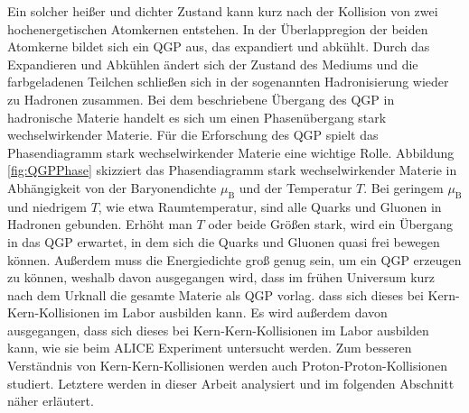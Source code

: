 \newline
Ein solcher hei{\ss}er und dichter Zustand kann kurz nach der Kollision von zwei hochenergetischen Atomkernen entstehen.
In der \"Uberlappregion der beiden Atomkerne bildet sich ein QGP aus, das expandiert und abk\"uhlt.
Durch das Expandieren und Abk\"uhlen \"andert sich der Zustand des Mediums und die farbgeladenen Teilchen schlie{\ss}en sich in der sogenannten Hadronisierung wieder zu Hadronen zusammen.
Bei dem beschriebene \"Ubergang des QGP in hadronische Materie handelt es sich um einen Phasen\"ubergang stark wechselwirkender Materie.
\newline
F\"ur die Erforschung des QGP spielt das Phasendiagramm stark wechselwirkender Materie eine wichtige Rolle.
Abbildung \ref{fig:QGPPhase} skizziert das Phasendiagramm stark wechselwirkender Materie in Abh\"angigkeit von der Baryonendichte $\mu_{\text{B}}$ und der Temperatur $T$.
Bei geringem $\mu_{\text{B}}$ und niedrigem $T$, wie etwa Raumtemperatur, sind alle Quarks und Gluonen in Hadronen gebunden.
Erh\"oht man $T$ oder beide Gr\"o{\ss}en stark, wird ein \"Ubergang in das QGP erwartet, in dem sich die Quarks und Gluonen quasi frei bewegen k\"onnen.
Au{\ss}erdem muss die Energiedichte gro{\ss} genug sein, um ein QGP erzeugen zu k\"onnen, weshalb davon ausgegangen wird, dass im fr\"uhen Universum kurz nach dem Urknall die gesamte Materie als QGP vorlag. 
dass sich dieses bei Kern-Kern-Kollisionen im Labor ausbilden kann.
Es wird au{\ss}erdem davon ausgegangen, dass sich dieses bei Kern-Kern-Kollisionen im Labor ausbilden kann, wie sie beim ALICE Experiment untersucht werden.
\newline
Zum besseren Verst\"andnis von Kern-Kern-Kollisionen werden auch Proton-Proton-Kollisionen studiert.
Letztere werden in dieser Arbeit analysiert und im folgenden Abschnitt n\"aher erl\"autert.